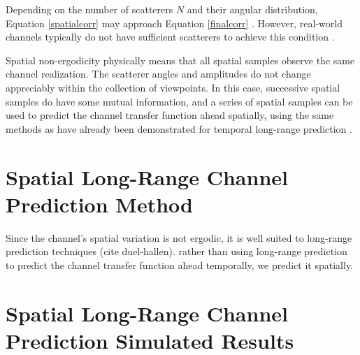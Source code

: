 \documentclass[11pt]{article} %
\begin{document}
Depending on the number of scatterers $N$ and their angular distribution, Equation \ref{spatialcorr} may approach Equation \ref{finalcorr} \cite{isukapalli}.  However, real-world channels typically do not have sufficient scatterers to achieve this condition \cite{was it Duel-Hallen who said this?}.  

Spatial non-ergodicity physically means that all spatial samples observe the same channel realization.  The scatterer angles and amplitudes do not change appreciably within the collection of viewpoints.  In this case, successive spatial samples do have some mutual information, and a series of spatial samples can be used to predict the channel transfer function ahead spatially, using the same methods as have already been demonstrated for temporal long-range prediction \cite{duel-hallen}.

\section{Spatial Long-Range Channel Prediction Method}\label{prediction}
Since the channel's spatial variation is not ergodic, it is well suited to long-range prediction techniques (cite duel-hallen). rather than using long-range prediction to predict the channel transfer function ahead temporally, we predict it spatially.  %



\section{Spatial Long-Range Channel Prediction Simulated Results}\label{simresults}

\end{document}
